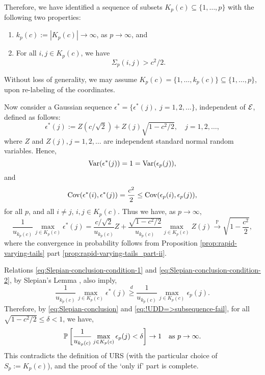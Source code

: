 Therefore, we have identified a sequence of subsets $K_p(c)\subseteq\{1,\ldots,p\}$ with the following two properties:
\begin{enumerate}
  \item $k_p(c) := \left|K_p(c)\right| \to \infty$, as $p\to\infty$, and
  \item For all $i,j\in K_p(c)$, we have
  \begin{equation} \label{eq:further_sub-sequence_of_sets_cor}
    \Sigma_p(i,j) > c^2/2.
  \end{equation}
\end{enumerate}
Without loss of generality, we may assume $K_p(c) = \{1,\ldots,k_p(c)\} \subseteq \{1,\ldots,p\}$, upon re-labeling of the coordinates. 

Now consider a Gaussian sequence $\epsilon^* = \{\epsilon^*(j),\;j = 1,2,\ldots\}$, independent of ${\cal E}$, defined as follows:
$$
\epsilon^*(j):= Z \left(c/\sqrt{2}\right) + Z(j) \sqrt{1-{c^2}/{2}}, \quad j = 1, 2, \ldots,
$$ 
where $Z$ and $Z(j), j = 1, 2, \ldots$ are independent standard normal random variables. 
Hence,
\begin{equation} \label{eq:Slepian-conclusion-condition-1}
    {\rm Var}(\epsilon^*(j)) = 1 = {\rm Var}(\epsilon_p(j)),
\end{equation}
and
\begin{equation} \label{eq:Slepian-conclusion-condition-2}
    \cov(\epsilon^*(i),\epsilon^*(j)) = \frac{c^2}{2} \le \cov(\epsilon_p(i),\epsilon_p(j)),
\end{equation}
for all $p$, and all $i\neq j$, $i,j\in K_p(c)$.
Thus we have, as $p\to\infty$, 
\begin{equation} \label{eq:!UDD=>subsequence-fail}
    \frac{1}{u_{k_p(c)}} \max_{j\in K_p(c)} \epsilon^*(j) = \frac{c/\sqrt{2}}{u_{k_p(c)}}Z + \frac{\sqrt{1-c^2/2}}{u_{k_p(c)}} \max_{j\in K_p(c)} Z(j) \stackrel{\mathbb P}{\to} \sqrt{1-\frac{c^2}{2}},
\end{equation}
where the convergence in probability follows from Proposition \ref{prop:rapid-varying-tails} part \ref{prop:rapid-varying-tails_part-ii}.

Relations \eqref{eq:Slepian-conclusion-condition-1} and \eqref{eq:Slepian-conclusion-condition-2}, by Slepian's Lemma \cite{slepian1962one}, also imply,
\begin{equation}\label{eq:Slepian-conclusion}
  \frac{1}{u_{k_p(c)}} \max_{j\in K_p(c)} \epsilon^*(j) \stackrel{d}{\ge} \frac{1}{u_{k_p(c)}} \max_{j\in K_p(c)} \epsilon_p(j).
\end{equation}
Therefore, by \eqref{eq:Slepian-conclusion} and \eqref{eq:!UDD=>subsequence-fail}, for all $\sqrt{1-c^2/2} \le \delta < 1$, we have,
$$
\P\left[\frac{1}{u_{k_p(c)}} \max_{j\in K_p(c)} \epsilon_p(j) < \delta \right] \to 1 \quad\mbox{as  }p\to\infty.
$$
This contradicts the definition of URS (with the particular choice of $S_p:=K_p(c)$), and the proof of the `only if' part is complete.

